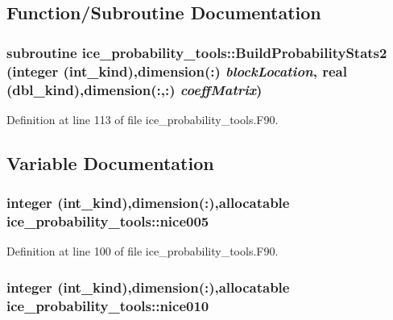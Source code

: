 \subsection{Function/Subroutine Documentation}
\hypertarget{namespaceice__probability__tools_a606ed01210f43ca631f18ef6aeb76170}{
\subsubsection[{BuildProbabilityStats2}]{\setlength{\rightskip}{0pt plus 5cm}subroutine ice\_\-probability\_\-tools::BuildProbabilityStats2 (integer (int\_\-kind),dimension(:) {\em blockLocation}, \/  real (dbl\_\-kind),dimension(:,:) {\em coeffMatrix})}}
\label{namespaceice__probability__tools_a606ed01210f43ca631f18ef6aeb76170}


Definition at line 113 of file ice\_\-probability\_\-tools.F90.

\subsection{Variable Documentation}
\hypertarget{namespaceice__probability__tools_a9061fb8c3f06ed148c2a394fc1af7536}{
\subsubsection[{nice005}]{\setlength{\rightskip}{0pt plus 5cm}integer (int\_\-kind),dimension(:),allocatable {\bf ice\_\-probability\_\-tools::nice005}}}
\label{namespaceice__probability__tools_a9061fb8c3f06ed148c2a394fc1af7536}


Definition at line 100 of file ice\_\-probability\_\-tools.F90.\hypertarget{namespaceice__probability__tools_a721bb86743f1f3f3b051779bbddcd27e}{
\subsubsection[{nice010}]{\setlength{\rightskip}{0pt plus 5cm}integer (int\_\-kind),dimension(:),allocatable {\bf ice\_\-probability\_\-tools::nice010}}}
\label{namespaceice__probability__tools_a721bb86743f1f3f3b051779bbddcd27e}



